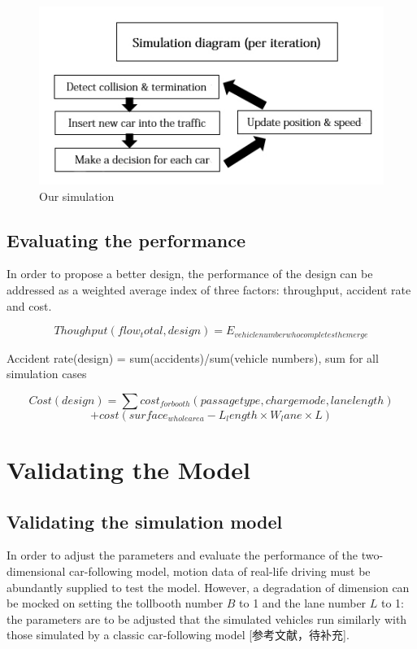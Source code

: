 \documentclass{mcmthesis}
\begin{document}
\begin{figure}[htbp]
	\small 
	\centering
	\caption{Our simulation}
	\includegraphics{simulation.jpg}
\end{figure}

\subsection{Evaluating the performance}

In order to propose a better design, the performance of the design can be addressed as a weighted average index of three factors: throughput, accident rate and cost. 

$$Thoughput(flow_total, design) = E_{vehicle number who completes the merge}$$

Accident rate(design) = sum(accidents)/sum(vehicle numbers), sum for all simulation cases

$$Cost(design)=\sum cost_{for booth}(passage type,charge mode,lane length)$$
$$+cost(surface_{whole area} - L_length \times W_lane \times L) $$


\section{Validating the Model}

\subsection{Validating the simulation model}

In order to adjust the parameters and evaluate the performance of the two-dimensional car-following model, motion data of real-life driving must be abundantly supplied to test the model. However, a degradation of dimension can be mocked on setting the tollbooth number $B$ to 1 and the lane number $L$ to 1: the parameters are to be adjusted that the simulated vehicles run similarly with those simulated by a classic car-following model [参考文献，待补充].
\end{document}
